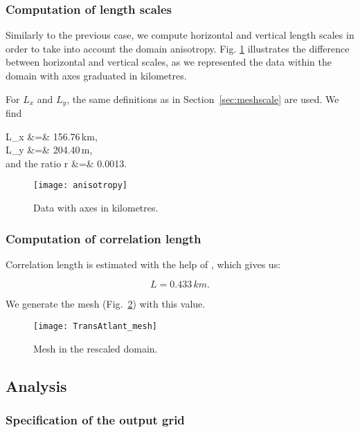 \subsubsection{Computation of length scales}

Similarly to the previous case, we compute horizontal and vertical length scales in order to take into account the domain anisotropy. Fig. \ref{fig:anisotropy} illustrates the difference between horizontal and vertical scales, as we represented the data within the domain with axes graduated in kilometres.

For $L_x$ and $L_y$, the same definitions as in Section~\ref{sec:meshscale} are used. We find

\beqn
L_x &=& 156.76\,km, \\
L_y &=& 204.40\,m, \\
\textrm{and the ratio\qquad} r &=&  0.0013.
\eeqn

\begin{figure}[htpb]
\centering
\texttt{[image: anisotropy]}
\caption{Data with axes in kilometres.\label{fig:anisotropy}}
\end{figure}



\subsubsection{Computation of correlation length}

Correlation length is estimated with the help of , which gives us:

\[L=0.433\,km.\]

We generate the mesh (Fig.~\ref{fig:trans_mesh}) with this value.

\begin{figure}[H]
\centering
\texttt{[image: TransAtlant\_mesh]}
\caption{Mesh in the rescaled domain.\label{fig:trans_mesh}}
\end{figure}



\subsection{Analysis}

\subsubsection{Specification of the output grid}

